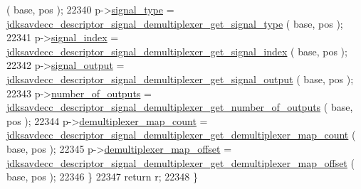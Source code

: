 \begin{DoxyCode}
      ( base, pos );
22340         p->\hyperlink{structjdksavdecc__descriptor__signal__demultiplexer_a248e60ef99d5ed1779989d1dd6b6dc5a}{signal\_type} = 
      \hyperlink{group__descriptor__signal__demultiplexer_ga3c41b6de1026362116f07d674b761617}{jdksavdecc\_descriptor\_signal\_demultiplexer\_get\_signal\_type}
      ( base, pos );
22341         p->\hyperlink{structjdksavdecc__descriptor__signal__demultiplexer_ae2e81a95ee9ad83f1fe22b6a1ee29075}{signal\_index} = 
      \hyperlink{group__descriptor__signal__demultiplexer_gac671d36e22d30c676383a69b1b99be0a}{jdksavdecc\_descriptor\_signal\_demultiplexer\_get\_signal\_index}
      ( base, pos );
22342         p->\hyperlink{structjdksavdecc__descriptor__signal__demultiplexer_ab4b91864e6fc335d7e86536d9f4461e4}{signal\_output} = 
      \hyperlink{group__descriptor__signal__demultiplexer_gacda254c08b78a4be2da6796076537d32}{jdksavdecc\_descriptor\_signal\_demultiplexer\_get\_signal\_output}
      ( base, pos );
22343         p->\hyperlink{structjdksavdecc__descriptor__signal__demultiplexer_acce19609ff3454a0c9b0213591331fa7}{number\_of\_outputs} = 
      \hyperlink{group__descriptor__signal__demultiplexer_ga6b8546f095f4c033e1c8d8d80d3ec436}{jdksavdecc\_descriptor\_signal\_demultiplexer\_get\_number\_of\_outputs}
      ( base, pos );
22344         p->\hyperlink{structjdksavdecc__descriptor__signal__demultiplexer_a5afb8e79e6e5c0ed3dd238c64db880cc}{demultiplexer\_map\_count} = 
      \hyperlink{group__descriptor__signal__demultiplexer_ga89ac5d307988437cb78b12890f31634d}{jdksavdecc\_descriptor\_signal\_demultiplexer\_get\_demultiplexer\_map\_count}
      ( base, pos );
22345         p->\hyperlink{structjdksavdecc__descriptor__signal__demultiplexer_a83202341fb27aff9f040befa95f63a08}{demultiplexer\_map\_offset} = 
      \hyperlink{group__descriptor__signal__demultiplexer_ga5d74dd31e9c5bf8c78874e7b37a9c9d6}{jdksavdecc\_descriptor\_signal\_demultiplexer\_get\_demultiplexer\_map\_offset}
      ( base, pos );
22346     \}
22347     \textcolor{keywordflow}{return} r;
22348 \}
\end{DoxyCode}


